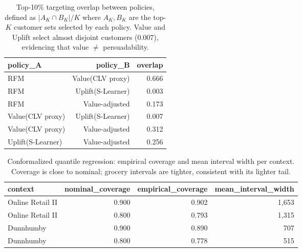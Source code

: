 \begin{table}[t]\centering
\caption{Top-10\% targeting overlap between policies, defined as $|A_K\cap B_K|/K$ where $A_K,B_K$ are the top-$K$ customer sets selected by each policy. Value and Uplift select almost disjoint customers (0.007), evidencing that value $\neq$ persuadability.}\label{tab:overlap}
\begin{tabular}{lrr}
\hline
policy\_A & policy\_B & overlap \\
\hline
RFM & Value(CLV proxy) & 0.666 \\
RFM & Uplift(S-Learner) & 0.003 \\
RFM & Value-adjusted & 0.173 \\
Value(CLV proxy) & Uplift(S-Learner) & 0.007 \\
Value(CLV proxy) & Value-adjusted & 0.312 \\
Uplift(S-Learner) & Value-adjusted & 0.256 \\
\hline
\end{tabular}
\end{table}

\begin{table}[t]\centering
\caption{Conformalized quantile regression: empirical coverage and mean interval width per context. Coverage is close to nominal; grocery intervals are tighter, consistent with its lighter tail.}\label{tab:cqr}
\begin{tabular}{lrrr}
\hline
context & nominal\_coverage & empirical\_coverage & mean\_interval\_width \\
\hline
Online Retail II & 0.900 & 0.902 & 1,653 \\
Online Retail II & 0.800 & 0.793 & 1,315 \\
Dunnhumby & 0.900 & 0.890 & 707 \\
Dunnhumby & 0.800 & 0.778 & 515 \\
\hline
\end{tabular}
\end{table}
